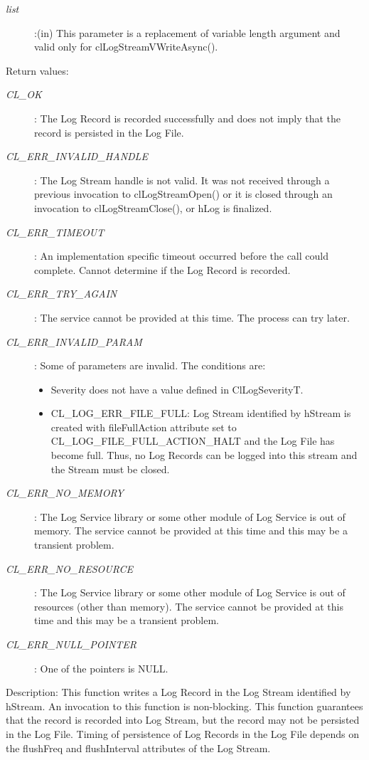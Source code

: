 \begin{flushleft}
\begin{Desc}
\begin{description}
\item[{\em list}]:(in) This parameter is a replacement of variable length argument and valid only for clLogStreamVWriteAsync().
\end{description}
\end{Desc}
\begin{Desc}
\item[Return values:]
\begin{description}
\item[{\em CL\_\-OK}]: The Log Record is recorded successfully and does not imply that the record is persisted in the Log File.
\item[{\em CL\_\-ERR\_\-INVALID\_\-HANDLE}]: The Log Stream handle is not valid. It was not received through a previous invocation to 
clLogStreamOpen() or it is closed through an invocation to clLogStreamClose(), or hLog is finalized.
\item[{\em CL\_\-ERR\_\-TIMEOUT}]: An implementation specific timeout occurred before the call could complete. Cannot determine if
the Log Record is recorded.
\item[{\em CL\_\-ERR\_\-TRY\_\-AGAIN}]: The service cannot be provided at this time. The process can try later.
\item[{\em CL\_\-ERR\_\-INVALID\_\-PARAM}]: Some of parameters are invalid. The conditions are:
\begin{itemize}
\item
Severity does not have a value defined in ClLogSeverityT.
\item
CL\_\-LOG\_\-ERR\_\-FILE\_\-FULL: Log Stream identified by hStream is created with fileFullAction attribute set to 
CL\_\-LOG\_\-FILE\_\-FULL\_\-ACTION\_\-HALT and the Log File
has become full. Thus, no Log Records can be logged into this stream and the Stream must be closed.
\end{itemize}
\item[{\em CL\_\-ERR\_\-NO\_\-MEMORY}]: The Log Service library or some other module of Log Service is out of memory. The service cannot 
be provided at this time and this may be a transient problem.
\item[{\em CL\_\-ERR\_\-NO\_\-RESOURCE}]: The Log Service library or some other module of Log Service is out of resources 
(other than memory). The service cannot be provided at this time and this may be a transient problem.
\item[{\em CL\_\-ERR\_\-NULL\_\-POINTER}]: One of the pointers is NULL.

\end{description}
\end{Desc}
\begin{Desc}
\item[Description:] This function writes a Log Record in the Log Stream identified by hStream. An invocation to this function is non-blocking. This 
function guarantees that the record is recorded into Log Stream, but the record may not be persisted in the Log File. Timing of 
persistence of Log Records in the Log File depends on the flushFreq and flushInterval attributes of the Log Stream.
\par


\end{Desc}
\end{flushleft}
